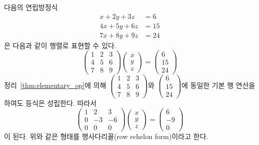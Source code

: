 \documentclass[unfonts,oneside,a4paper]{oblivoir}
\theoremstyle{definition}
\theoremstyle{theorem}
\theoremstyle{remark}
\theoremstyle{remark}
\theoremstyle{remark}
\theoremstyle{remark}
\begin{document}
다음의 연립방정식
\begin{align*}
    x + 2y + 3z &= 6\\
    4x + 5y + 6z &= 15\\
    7x + 8y + 9z &= 24
\end{align*}
은 다음과 같이 행렬로 표현할 수 있다.
\begin{equation*}
    \begin{pmatrix}
        1 & 2 & 3\\
        4 & 5 & 6\\
        7 & 8 & 9
    \end{pmatrix}
    \begin{pmatrix}
        x\\
        y\\
        z
    \end{pmatrix}
    =
    \begin{pmatrix}
        6\\
        15\\
        24
    \end{pmatrix}
\end{equation*}
   정리~\ref{thm:elementary_op}에 의해 $\begin{pmatrix}1&2&3\\4&5&6\\7&8&9\end{pmatrix}$와 $\begin{pmatrix}6\\15\\24\end{pmatrix}$에 동일한 기본 행 연산을 하여도 등식은 성립한다.
   따라서
   \begin{equation*}
        \begin{pmatrix}
            1 & 2& 3\\
            0 & -3 & -6\\
            0 & 0 & 0
        \end{pmatrix}
        \begin{pmatrix}
            x\\
            y\\
            z
        \end{pmatrix}
        =
        \begin{pmatrix}
            6\\
            -9\\
            0
        \end{pmatrix}
   \end{equation*}
   이 된다.
   위와 같은 형태를 행사다리꼴(row echelon form)이라고 한다.
\end{document}

